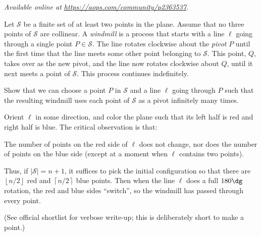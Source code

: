 \textsl{Available online at \url{https://aops.com/community/p2363537}.}
\begin{mdframed}[style=mdpurplebox,frametitle={Problem statement}]
Let $\mathcal{S}$ be a finite set of at least two points in the plane.
Assume that no three points of $\mathcal S$ are collinear.
A \emph{windmill} is a process that starts with a
line $\ell$ going through a single point $P \in \mathcal S$.
The line rotates clockwise about the \emph{pivot} $P$ until the first time
that the line meets some other point belonging to $\mathcal S$.
This point, $Q$, takes over as the new pivot,
and the line now rotates clockwise about $Q$,
until it next meets a point of $\mathcal S$.
This process continues indefinitely.

Show that we can choose a point $P$ in $\mathcal S$ and
a line $\ell$ going through $P$ such that the resulting windmill
uses each point of $\mathcal S$ as a pivot infinitely many times.
\end{mdframed}
Orient $\ell$ in some direction,
and color the plane such that its left half is red
and right half is blue.
The critical observation is that:
\begin{claim*}
  The number of points on the red side of $\ell$ does not change,
  nor does the number of points on the blue side
  (except at a moment when $\ell$ contains two points).
\end{claim*}

Thus, if $|\mathcal S| = n+1$,
it suffices to pick the initial configuration
so that there are $\left\lfloor n/2 \right\rfloor$
red and $\left\lceil n/2 \right\rceil$ blue points.
Then when the line $\ell$ does a full $180\dg$ rotation,
the red and blue sides ``switch'',
so the windmill has passed through every point.

(See official shortlist for verbose write-up;
this is deliberately short to make a point.)
\pagebreak